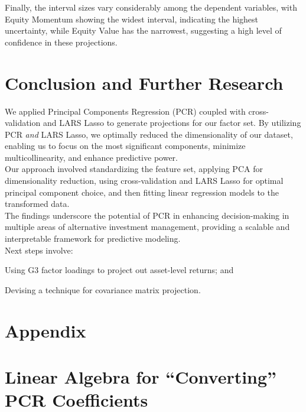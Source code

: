 \documentclass{ledger}
\begin{document}
Finally, the interval sizes vary considerably among the dependent variables, with Equity Momentum showing the widest interval, indicating the highest uncertainty, while Equity Value has the narrowest, suggesting a high level of confidence in these projections. 

\section{Conclusion and Further Research}
We applied Principal Components Regression (PCR) coupled with cross-validation and LARS Lasso to generate projections for our factor set. By utilizing PCR \textit{and} LARS Lasso, we optimally reduced the dimensionality of our dataset, enabling us to focus on the most significant components, minimize multicollinearity, and enhance predictive power. \\

Our approach involved standardizing the feature set, applying PCA for dimensionality reduction, using cross-validation and LARS Lasso for optimal principal component choice, and then fitting linear regression models to the transformed data. \\

The findings underscore the potential of PCR in enhancing decision-making in multiple areas of alternative investment management, providing a scalable and interpretable framework for predictive modeling. \\

Next steps involve:
\begin{compactenum}[$\bullet$]
	\item Using G3 factor loadings to project out asset-level returns; and
	\item Devising a technique for covariance matrix projection.
\end{compactenum}

\newpage

\ledgernotes
\section*{\Large Appendix}

\section*{Linear Algebra for ``Converting'' PCR Coefficients}
\end{document}
